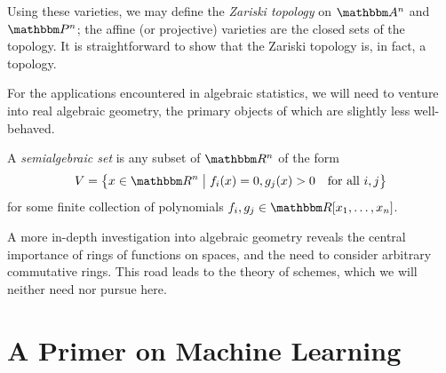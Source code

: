 \documentclass[11pt,titlepage]{article}
\newcommand*{\vbar}{\;\big\vert\;}
\begin{document}
    Using these varieties, we may define the \emph{Zariski topology} on $\A^n$
    and $\Proj^n$;  the affine (or projective) varieties are the closed sets of
    the topology.  It is straightforward to show that the Zariski topology is,
    in fact, a topology.

    For the applications encountered in algebraic statistics, we will need to
    venture into real algebraic geometry, the primary objects of which are
    slightly less well-behaved.
    \begin{definition}
        A \emph{semialgebraic set} is any subset of $\R^n$ of the form
        \[
            V = \cdil[\big]{ x \in \R^n \vbar
                f_i(x) = 0, g_j(x) > 0
            \quad\text{for all $i,j$}}
        \]
        for some finite collection of polynomials $f_i, g_j \in \R[x_1, \ldots,
        x_n]$.
    \end{definition}

    A more in-depth investigation into algebraic geometry reveals the central
    importance of rings of functions on spaces, and the need to consider
    arbitrary commutative rings.  This road leads to the theory of schemes,
    which we will neither need nor pursue here.

\section{A Primer on Machine Learning}

\nocite{*}


\end{document}
